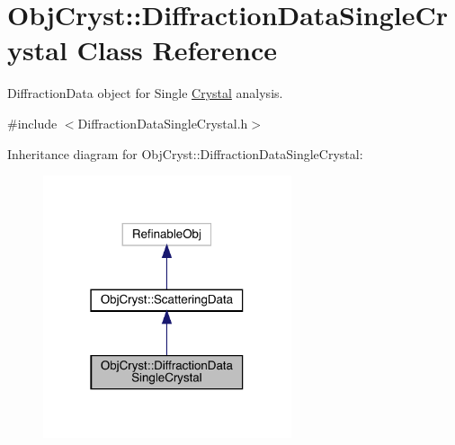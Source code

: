 \hypertarget{class_obj_cryst_1_1_diffraction_data_single_crystal}{}\section{Obj\+Cryst\+::Diffraction\+Data\+Single\+Crystal Class Reference}
\label{class_obj_cryst_1_1_diffraction_data_single_crystal}


Diffraction\+Data object for Single \mbox{\hyperlink{class_obj_cryst_1_1_crystal}{Crystal}} analysis.  




{\ttfamily \#include $<$Diffraction\+Data\+Single\+Crystal.\+h$>$}



Inheritance diagram for Obj\+Cryst\+::Diffraction\+Data\+Single\+Crystal\+:
\nopagebreak
\begin{figure}[H]
\begin{center}
\leavevmode
\includegraphics[width=207pt]{class_obj_cryst_1_1_diffraction_data_single_crystal__inherit__graph}
\end{center}
\end{figure}


